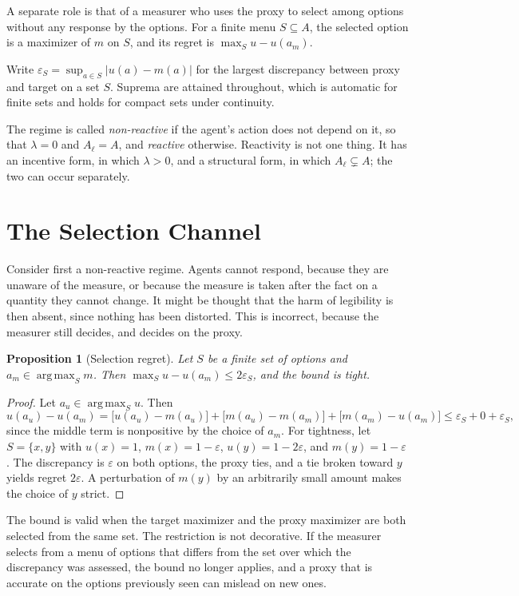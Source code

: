 \documentclass[11pt]{article}
\newtheorem{proposition}{Proposition}
\theoremstyle{remark}
\newcommand{\argmax}{\operatorname*{arg\,max}}
\begin{document}
A separate role is that of a measurer who uses the proxy to select among options without any response by the options. For a finite menu $S\subseteq A$, the selected option is a maximizer of $m$ on $S$, and its regret is $\max_S u-u(a_m)$.

Write $\varepsilon_S=\sup_{a\in S}|u(a)-m(a)|$ for the largest discrepancy between proxy and target on a set $S$. Suprema are attained throughout, which is automatic for finite sets and holds for compact sets under continuity.

The regime is called \emph{non-reactive} if the agent's action does not depend on it, so that $\lambda=0$ and $A_\ell=A$, and \emph{reactive} otherwise. Reactivity is not one thing. It has an incentive form, in which $\lambda>0$, and a structural form, in which $A_\ell\subsetneq A$; the two can occur separately.

\section{The Selection Channel}

Consider first a non-reactive regime. Agents cannot respond, because they are unaware of the measure, or because the measure is taken after the fact on a quantity they cannot change. It might be thought that the harm of legibility is then absent, since nothing has been distorted. This is incorrect, because the measurer still decides, and decides on the proxy.

\begin{proposition}[Selection regret]
Let $S$ be a finite set of options and $a_m\in\argmax_S m$. Then $\max_S u-u(a_m)\le 2\varepsilon_S$, and the bound is tight.
\end{proposition}

\begin{proof}
Let $a_u\in\argmax_S u$. Then
\[
u(a_u)-u(a_m)=\bigl[u(a_u)-m(a_u)\bigr]+\bigl[m(a_u)-m(a_m)\bigr]+\bigl[m(a_m)-u(a_m)\bigr]\le\varepsilon_S+0+\varepsilon_S,
\]
since the middle term is nonpositive by the choice of $a_m$. For tightness, let $S=\{x,y\}$ with $u(x)=1$, $m(x)=1-\varepsilon$, $u(y)=1-2\varepsilon$, and $m(y)=1-\varepsilon$. The discrepancy is $\varepsilon$ on both options, the proxy ties, and a tie broken toward $y$ yields regret $2\varepsilon$. A perturbation of $m(y)$ by an arbitrarily small amount makes the choice of $y$ strict.
\end{proof}

The bound is valid when the target maximizer and the proxy maximizer are both selected from the same set. The restriction is not decorative. If the measurer selects from a menu of options that differs from the set over which the discrepancy was assessed, the bound no longer applies, and a proxy that is accurate on the options previously seen can mislead on new ones.
\end{document}
